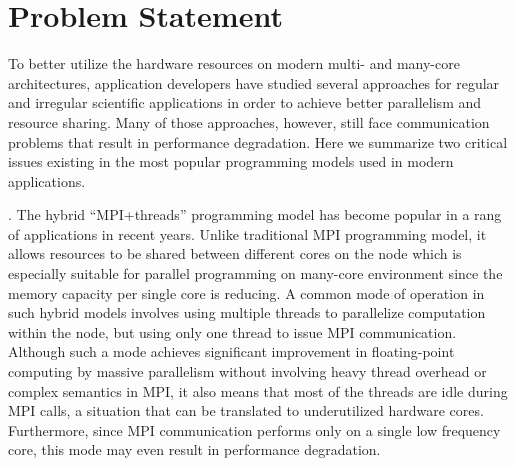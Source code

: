 \section{Problem Statement}

To better utilize the hardware resources on modern multi- and many-core
architectures, application developers have studied several approaches for
regular and irregular scientific applications in order to achieve
better parallelism and resource sharing. Many of those approaches, however,
still face communication problems that result in performance degradation.
Here we summarize two critical issues existing in the most popular
programming models used in modern applications.

.
The hybrid ``MPI+threads'' programming model has become popular
in a rang of applications in recent years. Unlike traditional MPI
programming model, it allows resources to be shared between different
cores on the node which is especially suitable for parallel programming
on many-core environment since the memory capacity per single core is
reducing. A common mode of operation in such hybrid models involves using
multiple threads to parallelize computation within the node, but using
only one thread to issue MPI communication. Although such a mode achieves
significant improvement in floating-point computing by massive parallelism
without involving heavy thread overhead or complex semantics in MPI, it
also means that most of the threads are idle during MPI calls, a situation
that can be translated to underutilized hardware cores. Furthermore, since
MPI communication performs only on a single low frequency core, this mode
may even result in performance degradation.

